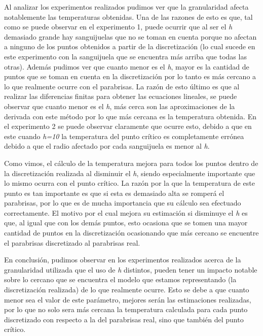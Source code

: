 \documentclass[10pt, a4paper]{article}
\begin{document}
Al analizar los experimentos realizados pudimos ver que la granularidad afecta notablemente las temperaturas obtenidas. Una de las razones de esto es que, tal como se puede observar en el experimento 1, puede ocurrir que al ser el \textit{h} demasiado grande hay sanguijuelas que no se toman en cuenta porque no afectan a ninguno de los puntos obtenidos a partir de la discretizaci\'on (lo cual sucede en este experimento con la sanguijuela que se encuentra m\'as arriba que todas las otras). Adem\'as pudimos ver que cuanto menor es el \textit{h}, mayor es la cantidad de puntos que se toman en cuenta en la discretizaci\'on por lo tanto es m\'as cercano a lo que realmente ocurre con el parabrisas. La raz\'on de esto \'ultimo es que al realizar las diferencias finitas para obtener las ecuaciones lineales, se puede observar que cuanto menor es el \textit{h}, m\'as cerca son las aproximaciones de la derivada con este m\'etodo por lo que m\'as cercana es la temperatura obtenida. En el experimento 2 se puede observar claramente que ocurre esto, debido a que en este cuando \textit{h=10} la temperatura del punto cr\'itico es completamente err\'onea debido a que el radio afectado por cada sanguijuela es menor al \textit{h}.

Como vimos, el c\'alculo de la temperatura mejora para todos los puntos dentro de la discretizaci\'on realizada al disminuir el \textit{h}, siendo especialmente importante que lo mismo ocurra con el punto cr\'itico. La raz\'on por la que la temperatura de este punto es tan importante es que si esta es demasiado alta se romper\'a el parabrisas, por lo que es de mucha importancia que su c\'alculo sea efectuado correctamente. El motivo por el cual mejora su estimaci\'on si disminuye el \textit{h} es que, al igual que con los dem\'as puntos, esto ocasiona que se tomen una mayor cantidad de puntos en la discretizaci\'on ocasionando que m\'as cercano se encuentre el parabrisas discretizado al parabrisas real.

En conclusi\'on, pudimos observar en los experimentos realizados acerca de la granularidad utilizada que el uso de \textit{h} distintos, pueden tener un impacto notable sobre lo cercano que se encuentra el modelo que estamos representando (la discretizaci\'on realizada) de lo que realmente ocurre. Esto se debe a que cuanto menor sea el valor de este par\'ametro, mejores ser\'an las estimaciones realizadas, por lo que no solo sera m\'as cercana la temperatura calculada para cada punto discretizado con respecto a la del parabrisas real, sino que tambi\'en del punto cr\'itico.
\end{document}
